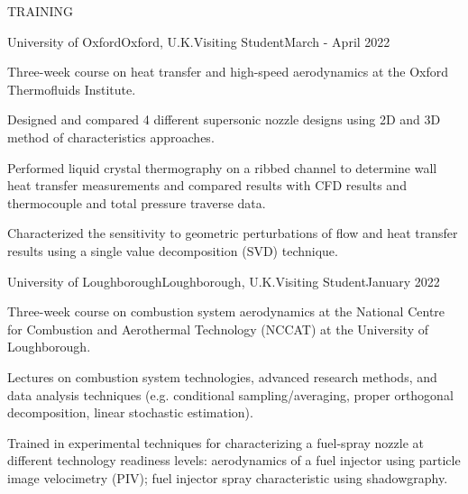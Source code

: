 \documentclass{resume} %
\begin{document}
\begin{rSection}{TRAINING}
\begin{rSubsection}
    {University of Oxford}{Oxford, U.K.}{Visiting Student}{March - April 2022}
\item Three-week course on heat transfer and high-speed aerodynamics at the Oxford Thermofluids Institute. 

\item Designed and compared 4 different supersonic nozzle designs using 2D and 3D method of characteristics approaches. 

\item Performed liquid crystal thermography on a ribbed channel to determine wall heat transfer measurements and compared results with CFD results and thermocouple and total pressure traverse data.

\item Characterized the sensitivity to geometric perturbations of flow and heat transfer results using a single value decomposition (SVD) technique.

\end{rSubsection}




\begin{rSubsection}
    {University of Loughborough}{Loughborough, U.K.}{Visiting Student}{January 2022}
\item  Three-week course on combustion system aerodynamics at the National Centre for Combustion and Aerothermal Technology (NCCAT) at the University of Loughborough. 

\item Lectures on combustion system technologies, advanced research methods, and data analysis
techniques (e.g. conditional sampling/averaging, proper orthogonal decomposition, linear stochastic
estimation). 
\item Trained in experimental techniques for characterizing a fuel-spray nozzle at different technology readiness levels: aerodynamics of a fuel injector using particle image velocimetry (PIV); fuel injector spray characteristic using shadowgraphy.  
\end{rSubsection}
    
\end{rSection}


\end{document}

